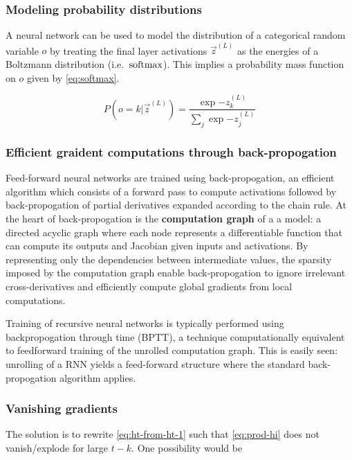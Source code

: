 \subsubsection{Modeling probability distributions}

A neural network can be used to model the distribution of a categorical random
variable $o$ by treating the final layer activations $\vec{z}^{(L)}$ as the
energies of a Boltzmann distribution (i.e.\ $\operatorname*{softmax}$). This implies a
probability mass function on $o$ given by \autoref{eq:softmax}.

\begin{equation}
    \label{eq:softmax}
    P(o = k | \vec{z}^{(L)}) = \frac{\exp{-z^{(L)}_k}}{ \sum_{j} \exp{-z^{(L)}_j} }
\end{equation}

\subsubsection{Efficient graident computations through back-propogation}

Feed-forward neural networks are trained using back-propogation, an efficient
algorithm which consists of a forward pass to compute activations followed by
back-propogation of partial derivatives expanded according to the chain
rule. At the heart of back-propogation is the
\textbf{computation graph} of a a model: a directed acyclic graph where each
node represents a differentiable function that can compute its outputs and
Jacobian given inputs and activations. By representing only
the dependencies between intermediate values, the sparsity imposed by the
computation graph enable back-propogation to ignore irrelevant
cross-derivatives and efficiently compute global gradients from local
computations.


Training of recursive neural networks is typically performed using
backpropogation through time (BPTT)\cite{At}, a technique computationally
equivalent to feedforward training of the unrolled computation graph. This is
easily seen: unrolling of a RNN yields a feed-forward structure where the
standard back-propogation algorithm applies.




\subsubsection{Vanishing gradients}

The solution is to rewrite \autoref{eq:ht-from-ht-1} such that
\autoref{eq:prod-hi} does not vanish/explode for large $t - k$.
One possibility would be

